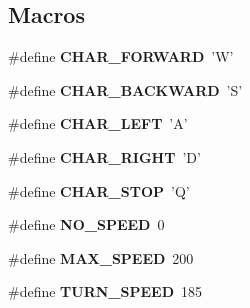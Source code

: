 \subsection*{Macros}
\begin{DoxyCompactItemize}
\item 
\hypertarget{arduino-sketch_8ino_a764dbd349d8621accd792ee5210a3f74}{\#define {\bfseries C\+H\+A\+R\+\_\+\+F\+O\+R\+W\+A\+R\+D}~'W'}\label{arduino-sketch_8ino_a764dbd349d8621accd792ee5210a3f74}

\item 
\hypertarget{arduino-sketch_8ino_a1681b01a2698687a9b6aedd45b796f40}{\#define {\bfseries C\+H\+A\+R\+\_\+\+B\+A\+C\+K\+W\+A\+R\+D}~'S'}\label{arduino-sketch_8ino_a1681b01a2698687a9b6aedd45b796f40}

\item 
\hypertarget{arduino-sketch_8ino_aa05ecc497d01a93be5dd62ddaee54a75}{\#define {\bfseries C\+H\+A\+R\+\_\+\+L\+E\+F\+T}~'A'}\label{arduino-sketch_8ino_aa05ecc497d01a93be5dd62ddaee54a75}

\item 
\hypertarget{arduino-sketch_8ino_a94f7d75840f1acbd2c2acd01fc115d88}{\#define {\bfseries C\+H\+A\+R\+\_\+\+R\+I\+G\+H\+T}~'D'}\label{arduino-sketch_8ino_a94f7d75840f1acbd2c2acd01fc115d88}

\item 
\hypertarget{arduino-sketch_8ino_a245db460299318b2a2b61c2f884c1d19}{\#define {\bfseries C\+H\+A\+R\+\_\+\+S\+T\+O\+P}~'Q'}\label{arduino-sketch_8ino_a245db460299318b2a2b61c2f884c1d19}

\item 
\hypertarget{arduino-sketch_8ino_ae84e9944a7983ebfabc5ad16c9fbc04d}{\#define {\bfseries N\+O\+\_\+\+S\+P\+E\+E\+D}~0}\label{arduino-sketch_8ino_ae84e9944a7983ebfabc5ad16c9fbc04d}

\item 
\hypertarget{arduino-sketch_8ino_ac2cd96d53dd3ba6407db6766c3d92b26}{\#define {\bfseries M\+A\+X\+\_\+\+S\+P\+E\+E\+D}~200}\label{arduino-sketch_8ino_ac2cd96d53dd3ba6407db6766c3d92b26}

\item 
\hypertarget{arduino-sketch_8ino_afa9188776d909e94ead6cf6ffbbdd1e8}{\#define {\bfseries T\+U\+R\+N\+\_\+\+S\+P\+E\+E\+D}~185}\label{arduino-sketch_8ino_afa9188776d909e94ead6cf6ffbbdd1e8}

\end{DoxyCompactItemize}
